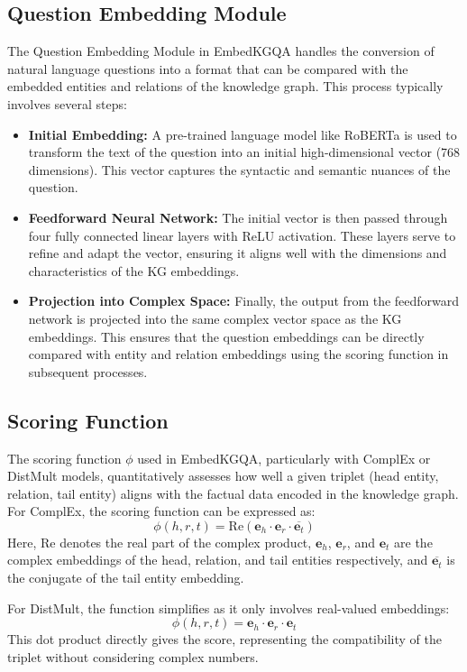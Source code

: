 \documentclass{article}
\begin{document}
\subsection{Question Embedding Module}
The Question Embedding Module in EmbedKGQA handles the conversion of natural language questions into a format that can be compared with the embedded entities and relations of the knowledge graph. This process typically involves several steps:
\begin{itemize}
    \item \textbf{Initial Embedding:} A pre-trained language model like RoBERTa is used to transform the text of the question into an initial high-dimensional vector (768 dimensions). This vector captures the syntactic and semantic nuances of the question.
    \item \textbf{Feedforward Neural Network:} The initial vector is then passed through four fully connected linear layers with ReLU activation. These layers serve to refine and adapt the vector, ensuring it aligns well with the dimensions and characteristics of the KG embeddings.
    \item \textbf{Projection into Complex Space:} Finally, the output from the feedforward network is projected into the same complex vector space as the KG embeddings. This ensures that the question embeddings can be directly compared with entity and relation embeddings using the scoring function in subsequent processes.
\end{itemize}

\subsection{Scoring Function}
The scoring function $\phi$ used in EmbedKGQA, particularly with ComplEx or DistMult models, quantitatively assesses how well a given triplet (head entity, relation, tail entity) aligns with the factual data encoded in the knowledge graph. For ComplEx, the scoring function can be expressed as:
\[
\phi(h, r, t) = \text{Re}(\mathbf{e}_h \cdot \mathbf{e}_r \cdot \overline{\mathbf{e}_t})
\]
Here, $\text{Re}$ denotes the real part of the complex product, $\mathbf{e}_h$, $\mathbf{e}_r$, and $\mathbf{e}_t$ are the complex embeddings of the head, relation, and tail entities respectively, and $\overline{\mathbf{e}_t}$ is the conjugate of the tail entity embedding.

For DistMult, the function simplifies as it only involves real-valued embeddings:
\[
\phi(h, r, t) = \mathbf{e}_h \cdot \mathbf{e}_r \cdot \mathbf{e}_t
\]
This dot product directly gives the score, representing the compatibility of the triplet without considering complex numbers.
\end{document}
